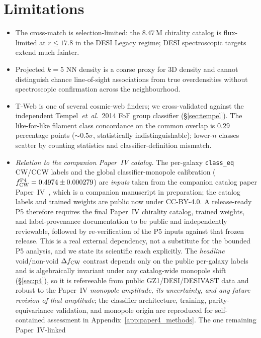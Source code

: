 \documentclass[aps,prd,twocolumn,superscriptaddress,showpacs,preprintnumbers,nofootinbib,longbibliography,floatfix]{revtex4-2}
\newcommand{\paperIVarxiv}{companion manuscript in preparation}
\begin{document}
\section{Limitations}\label{sec:limitations}

\begin{itemize}
\item The cross-match is selection-limited: the $8.47$\,M chirality
catalog is flux-limited at $r\!\le\!17.8$ in the DESI Legacy regime;
DESI spectroscopic targets extend much fainter.
\item Projected $k\!=\!5$ NN density is a coarse proxy for 3D density
and cannot distinguish chance line-of-sight associations from true
overdensities without spectroscopic confirmation across the
neighbourhood.
\item T-Web is one of several cosmic-web finders; we cross-validated
against the independent Tempel~\textit{et~al.}~2014 \cite{Tempel2014}
FoF group classifier (\S\ref{sec:tempel}). The like-for-like filament
class
concordance on the common overlap is $0.29$\,percentage points
(${\sim}0.5\sigma$, statistically indistinguishable); lower-$n$
classes scatter by counting statistics and
classifier-definition mismatch.
\item \emph{Relation to the companion Paper~IV catalog.}
The per-galaxy \texttt{class\_eq} CW/CCW labels and
the global classifier-monopole calibration ($f_{\rm CW}^{\rm P4} =
0.4974 \pm 0.000279$) are \emph{inputs} taken from the companion catalog
paper Paper~IV~\cite{golden_chirality_2026}, which is a
\paperIVarxiv; the catalog labels and trained weights are public now under
CC-BY-4.0. A release-ready P5 therefore requires the final Paper~IV
chirality catalog, trained weights, and label-provenance documentation to
be public and independently reviewable, followed by re-verification of the
P5 inputs against that frozen release. This is a real external dependency,
not a substitute for the bounded P5 analysis, and we state its scientific
reach explicitly. The \emph{headline}
void/non-void $\Delta f_{\rm CW}$ contrast depends only on the public
per-galaxy labels and is algebraically invariant under any catalog-wide
monopole shift (\S\ref{sec:p4}), so it is refereeable from public
GZ1/DESI/DESIVAST data and robust to the Paper~IV \emph{monopole amplitude,
its uncertainty, and any future revision of that amplitude}; the classifier
architecture, training, parity-equivariance validation, and monopole origin
are reproduced for self-contained assessment in
Appendix~\ref{app:paper4_methods}. The one remaining Paper~IV-linked

\end{itemize}
\end{document}
